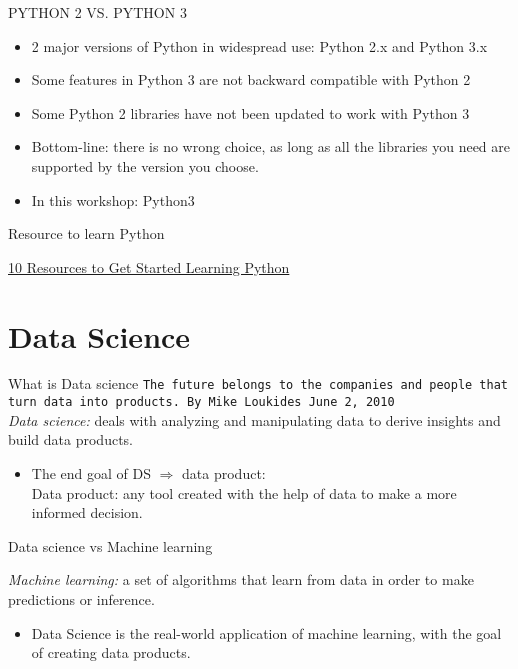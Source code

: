\documentclass{bredelebeamer}
\begin{document}
\begin{frame}{PYTHON 2 VS. PYTHON 3}
\begin{itemize}
	\item 2 major versions of Python in widespread use:
Python 2.x and Python 3.x
\item Some features in Python 3 are not backward compatible with Python 2
\item Some Python 2 libraries have not been updated to work with Python 3
\item Bottom-line: there is no wrong choice, as long as all the libraries you need are supported by the version you choose.
\item In this workshop: Python3
\end{itemize}	

\end{frame}



\begin{frame}{Resource to learn Python}

{\LARGE
\href{https://simpleprogrammer.com/2017/02/15/get-started-learning-python/}{10 Resources to Get Started Learning Python}
}
\end{frame}

	
\section{Data Science}
\begin{frame}{What is Data science}
\texttt{The future belongs to the companies and people that turn data into products.
By Mike Loukides June 2, 2010}\\[0.5cm]
\pause
\emph{Data science:}  deals with analyzing and manipulating data to derive insights and build data products.
\begin{itemize}
	\item The end goal of DS $\Rightarrow$ data product:\\[0.25cm] \pause
	 \alert{Data product}: any tool created with the help of data to make a more informed decision.
\end{itemize}	
\end{frame}

\begin{frame}{Data science vs Machine learning}

\emph{Machine learning:}  a set of algorithms that learn from data in order to make predictions or inference.
\begin{itemize}
	\item Data Science is the real-world application of machine learning, with the goal of creating data products.
\end{itemize}	
\end{frame}
\end{document}
